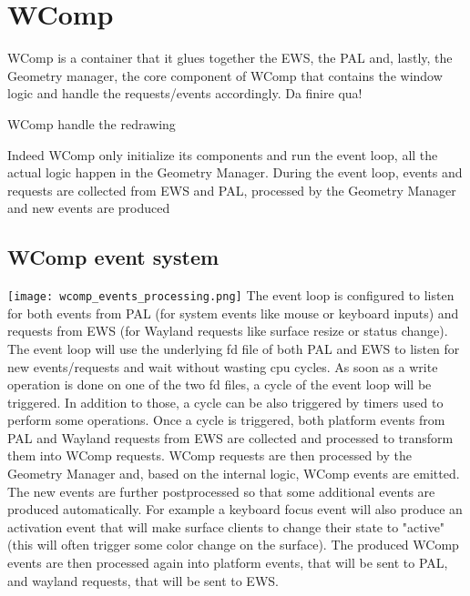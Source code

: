 \chapter{WComp}
WComp is a container that it glues together the EWS, the PAL and, lastly, the Geometry manager, the core component of WComp that contains the window logic and handle the requests/events accordingly. 
\todo Da finire qua!

WComp handle the redrawing

Indeed WComp only initialize its components and run the event loop, all the actual logic happen in the Geometry Manager. During the event loop, events and requests are collected from EWS and PAL, processed by the Geometry Manager and new events are produced

\section{WComp event system}
\begin{multicols}{2}
	\vspace*{\fill}
	{
	\centering
	\texttt{[image: wcomp\_events\_processing.png]}
	}
	\vspace*{\fill}
	\columnbreak
	\vspace*{\fill}
	The event loop is configured to listen for both events from PAL (for system events like mouse or keyboard inputs) and requests from EWS (for Wayland requests like surface resize or status change). The event loop will use the underlying fd file of both PAL and EWS to listen for new events/requests and wait without wasting cpu cycles. As soon as a write operation is done on one of the two fd files, a cycle of the event loop will be triggered. In addition to those, a cycle can be also triggered by timers used to perform some operations. Once a cycle is triggered, both platform events from PAL and Wayland requests from EWS are collected and processed to transform them into WComp requests.
	WComp requests are then processed by the Geometry Manager and, based on the internal logic, WComp events are emitted. The new events are further postprocessed so that some additional events are produced automatically. For example a keyboard focus event will also produce an activation event that will make surface clients to change their state to "active" (this will often trigger some color change on the surface).
	The produced WComp events are then processed again into platform events, that will be sent to PAL, and wayland requests, that will be sent to EWS.
	\vspace*{\fill}
\end{multicols}
